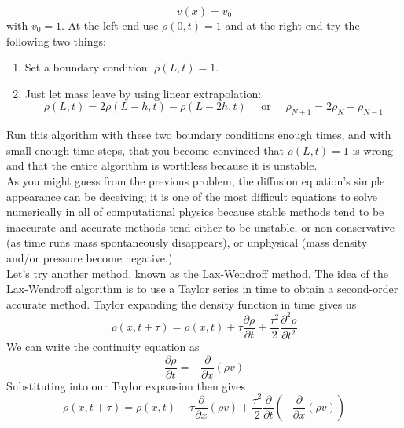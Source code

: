 \begin{equation}\label{eq:104}
v(x)=v_0
\end{equation}
with $v_{0}=1$. At the left end use $\rho(0, t)=1$ and at the right end try the following two things:
\begin{enumerate}[label=(\roman*)]
\item Set a boundary condition: $\rho(L, t)=1$.
\item Just let mass leave by using linear extrapolation:
	\begin{equation}\label{eq:105}
\rho(L, t)=2 \rho(L-h, t)-\rho(L-2 h, t) \quad \text { or } \quad \rho_{N+1}=2 \rho_{N}-\rho_{N-1}
\end{equation}


\end{enumerate}
Run this algorithm with these two boundary conditions enough times, and with small enough time steps, that you become convinced that $\rho(L, t)=1$ is wrong and that the entire algorithm is worthless because it is unstable.\\
As you might guess from the previous problem, the diffusion equation's simple appearance can be deceiving; it is one of the most difficult equations to solve numerically in all of computational physics because stable methods tend to be inaccurate and accurate methods tend either to be unstable, or non-conservative (as time runs mass spontaneously disappears), or unphysical (mass density and/or pressure become negative.)\\
Let\rq s try another method, known as the Lax-Wendroff method. The idea of the Lax-Wendroff algorithm is to use a Taylor series in time to obtain a second-order accurate method. Taylor expanding the density function in time gives us
\begin{equation}\label{eq:106}
\rho(x, t+\tau)=\rho(x, t)+\tau \frac{\partial \rho}{\partial t}+\frac{\tau^{2}}{2} \frac{\partial^{2} \rho}{\partial t^{2}}
\end{equation}
We can write the continuity equation as
\begin{equation}\label{eq:107}
\frac{\partial \rho}{\partial t}=-\frac{\partial}{\partial x}(\rho v)
\end{equation}
Substituting into our Taylor expansion then gives
\begin{equation}\label{eq:108}
\rho(x, t+\tau)=\rho(x, t)-\tau \frac{\partial}{\partial x}(\rho v)+\frac{\tau^{2}}{2} \frac{\partial}{\partial t}\left(-\frac{\partial}{\partial x}(\rho v)\right)
\end{equation}
